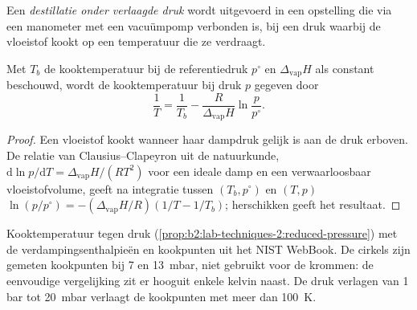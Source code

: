 \begin{definition}\label{def:b2:lab-techniques-2:reduced-pressure}
Een \emph{destillatie onder verlaagde druk} wordt uitgevoerd
in een opstelling die via een manometer met een vacuümpomp verbonden is, bij een druk waarbij de vloeistof kookt op een
temperatuur die ze verdraagt.
\end{definition}

\begin{proposition}\label{prop:b2:lab-techniques-2:reduced-pressure}
Met $T_b$ de kooktemperatuur bij de referentiedruk $p^\circ$ en $\Delta_{\mathrm{vap}}H$
als constant beschouwd, wordt de kooktemperatuur bij druk $p$ gegeven door
\begin{equation*}
\frac{1}{T} = \frac{1}{T_b} - \frac{R}{\Delta_{\mathrm{vap}}H}\ln\frac{p}{p^\circ}.
\end{equation*}
\end{proposition}

\begin{proof}
Een vloeistof kookt wanneer haar dampdruk gelijk is aan de druk erboven. De relatie van Clausius--Clapeyron
uit de natuurkunde, $\mathrm d\ln p/\mathrm dT = \Delta_{\mathrm{vap}}H/(RT^2)$ voor een ideale damp en een
verwaarloosbaar vloeistofvolume, geeft na integratie tussen $(T_b, p^\circ)$ en $(T, p)$ $\ln(p/p^\circ) =
-(\Delta_{\mathrm{vap}}H/R)(1/T - 1/T_b)$; herschikken geeft het resultaat.
\end{proof}

\begin{omfigure}

{\small Kooktemperatuur tegen druk (\cref{prop:b2:lab-techniques-2:reduced-pressure}) met
de verdampingsenthalpieën en kookpunten uit het NIST WebBook. De cirkels zijn gemeten
kookpunten bij 7 en \qty{13}{mbar}, niet gebruikt voor de krommen: de eenvoudige vergelijking zit er hooguit enkele kelvin naast.
De druk verlagen van 1 bar tot \qty{20}{mbar} verlaagt de kookpunten met meer dan
\qty{100}{K}.}
\end{omfigure}

